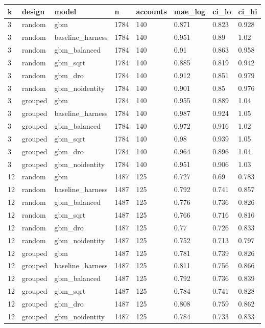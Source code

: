 \begin{tabular}{llllllll}
\toprule
k & design & model & n & accounts & mae\_log & ci\_lo & ci\_hi \\
\midrule
3 & random & gbm & 1784 & 140 & 0.871 & 0.823 & 0.928 \\
3 & random & baseline\_harness & 1784 & 140 & 0.951 & 0.89 & 1.02 \\
3 & random & gbm\_balanced & 1784 & 140 & 0.91 & 0.863 & 0.958 \\
3 & random & gbm\_sqrt & 1784 & 140 & 0.885 & 0.819 & 0.942 \\
3 & random & gbm\_dro & 1784 & 140 & 0.912 & 0.851 & 0.979 \\
3 & random & gbm\_noidentity & 1784 & 140 & 0.901 & 0.85 & 0.976 \\
3 & grouped & gbm & 1784 & 140 & 0.955 & 0.889 & 1.04 \\
3 & grouped & baseline\_harness & 1784 & 140 & 0.987 & 0.924 & 1.05 \\
3 & grouped & gbm\_balanced & 1784 & 140 & 0.972 & 0.916 & 1.02 \\
3 & grouped & gbm\_sqrt & 1784 & 140 & 0.98 & 0.939 & 1.05 \\
3 & grouped & gbm\_dro & 1784 & 140 & 0.964 & 0.896 & 1.04 \\
3 & grouped & gbm\_noidentity & 1784 & 140 & 0.951 & 0.906 & 1.03 \\
12 & random & gbm & 1487 & 125 & 0.727 & 0.69 & 0.783 \\
12 & random & baseline\_harness & 1487 & 125 & 0.792 & 0.741 & 0.857 \\
12 & random & gbm\_balanced & 1487 & 125 & 0.776 & 0.736 & 0.826 \\
12 & random & gbm\_sqrt & 1487 & 125 & 0.766 & 0.716 & 0.816 \\
12 & random & gbm\_dro & 1487 & 125 & 0.77 & 0.726 & 0.833 \\
12 & random & gbm\_noidentity & 1487 & 125 & 0.752 & 0.713 & 0.797 \\
12 & grouped & gbm & 1487 & 125 & 0.781 & 0.739 & 0.826 \\
12 & grouped & baseline\_harness & 1487 & 125 & 0.811 & 0.756 & 0.866 \\
12 & grouped & gbm\_balanced & 1487 & 125 & 0.792 & 0.736 & 0.839 \\
12 & grouped & gbm\_sqrt & 1487 & 125 & 0.784 & 0.741 & 0.828 \\
12 & grouped & gbm\_dro & 1487 & 125 & 0.808 & 0.759 & 0.862 \\
12 & grouped & gbm\_noidentity & 1487 & 125 & 0.784 & 0.733 & 0.833 \\
\bottomrule
\end{tabular}